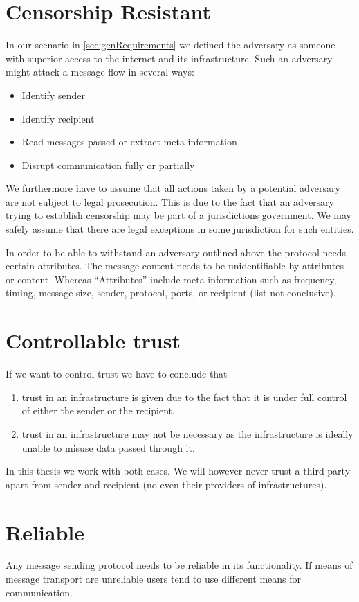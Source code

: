 \section{Censorship Resistant}
In our scenario in \ref{sec:genRequirements} we defined the adversary as someone with superior access to the internet and its infrastructure. Such an adversary might attack a message flow in several ways:
\begin{itemize}
	\item Identify sender
	\item Identify recipient
	\item Read messages passed or extract meta information
	\item Disrupt communication fully or partially
\end{itemize}

We furthermore have to assume that all actions taken by a potential adversary are not subject to legal prosecution. This is due to the fact that an adversary trying to establish censorship may be part of a jurisdictions government. We may safely assume that there are legal exceptions in some jurisdiction for such entities.

In order to be able to withstand an adversary outlined above the protocol needs certain attributes. The message content needs to be unidentifiable by attributes or content. Whereas ``Attributes'' include meta information such as frequency, timing, message size, sender, protocol, ports, or recipient (list not conclusive).

\section{Controllable trust}
If we want to control trust we have to conclude that
\begin{enumerate}
	\item trust in an infrastructure is given due to the fact that it is under full control of either the sender or the recipient.
	\item trust in an infrastructure may not be necessary as the infrastructure is ideally unable to misuse data passed through it.
\end{enumerate}
In this thesis we work with both cases. We will however never trust a third party apart from sender and recipient (no even their providers of infrastructures).

\section{Reliable}
Any message sending protocol needs to be reliable in its functionality. If means of message transport are unreliable users tend to use different means for communication. 

